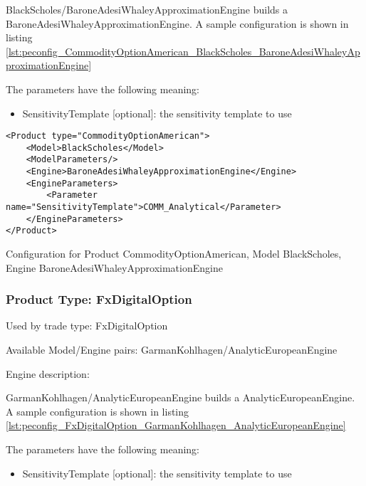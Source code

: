 BlackScholes/BaroneAdesiWhaleyApproximationEngine builds a BaroneAdesiWhaleyApproximationEngine. A sample configuration is shown in listing
\ref{lst:peconfig_CommodityOptionAmerican_BlackScholes_BaroneAdesiWhaleyApproximationEngine}

The parameters have the following meaning:

\begin{itemize}
\item SensitivityTemplate [optional]: the sensitivity template to use 
\end{itemize}

\begin{longlisting}
\begin{verbatim}
<Product type="CommodityOptionAmerican">
    <Model>BlackScholes</Model>
    <ModelParameters/>
    <Engine>BaroneAdesiWhaleyApproximationEngine</Engine>
    <EngineParameters>
        <Parameter name="SensitivityTemplate">COMM_Analytical</Parameter>
    </EngineParameters>
</Product>
\end{verbatim}
\caption{Configuration for Product CommodityOptionAmerican, Model BlackScholes, Engine BaroneAdesiWhaleyApproximationEngine}
\label{lst:peconfig_CommodityOptionAmerican_BlackScholes_BaroneAdesiWhaleyApproximationEngine}
\end{longlisting}

\subsubsection{Product Type: FxDigitalOption}

Used by trade type: FxDigitalOption

Available Model/Engine pairs: GarmanKohlhagen/AnalyticEuropeanEngine

Engine description:

GarmanKohlhagen/AnalyticEuropeanEngine builds a AnalyticEuropeanEngine. A sample configuration is shown in listing
\ref{lst:peconfig_FxDigitalOption_GarmanKohlhagen_AnalyticEuropeanEngine}

The parameters have the following meaning:

\begin{itemize}
\item SensitivityTemplate [optional]: the sensitivity template to use 
\end{itemize}

